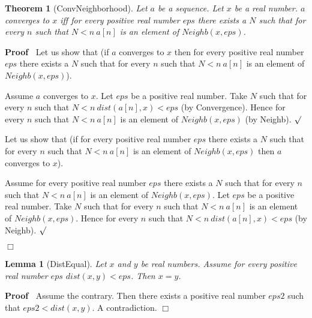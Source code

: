 \documentclass{article}
\newenvironment{forthel}{\begin{leftbar}}{\end{leftbar}}
\newenvironment{proof}{\noindent\textbf{Proof\ }}{\hspace*{\fill}$\Box$\medskip}
\newenvironment{subproof}{\begin{list}{}{}
		\item[\text{Proof}]}{\hfill $\surd$ \end{list}}
\newtheorem{lemma}{Lemma}
\newtheorem{theorem}{Theorem}
\begin{document}
\begin{forthel}
	\begin{theorem}[ConvNeighborhood]
	Let $a$ be a sequence. Let $x$ be a real number.
	$a$ converges to $x$ iff for every positive real number $eps$ there exists a $N$
	such that for every $n$ such that $N < n \ a[n]$ is an element of $Neighb(x,eps)$.
	\end{theorem}
	\begin{proof}
	Let us show that (if $a$ converges to $x$ then for every positive real number $eps$ there exists a $N$
	such that for every $n$ such that $N < n \ a[n]$ is an element of $Neighb(x,eps)$).
	\begin{subproof}
	Assume $a$ converges to $x$.
	Let $eps$ be a positive real number.
	Take $N$ such that for every $n$ such that $N < n \ dist(a[n],x) < eps$ (by Convergence).
	Hence for every $n$ such that $N < n \ a[n]$ is an element of $Neighb(x,eps)$ (by Neighb).
	\end{subproof}
	Let us show that (if for every positive real number $eps$ there exists a $N$ such that
	for every $n$ such that $N < n \ a[n]$ is an element of $Neighb(x,eps)$ then $a$ converges to $x$).
	\begin{subproof}
	Assume for every positive real number $eps$ there exists a $N$ such that
	for every $n$ such that $N < n \ a[n]$ is an element of $Neighb(x,eps)$.
	Let $eps$ be a positive real number.
	Take $N$ such that for every $n$ such that $N < n \ a[n]$ is an element of $Neighb(x,eps)$.
	Hence for every $n$ such that $N < n \ dist(a[n],x) < eps$ (by Neighb).
	\end{subproof}
	\end{proof}	
	
	\begin{lemma}[DistEqual]
	Let $x$ and $y$ be real numbers. Assume for every positive real number $eps$ $dist(x,y) < eps$.
	Then $x = y$.
	\end{lemma}
	\begin{proof}
	Assume the contrary.
	Then there exists a positive real number $eps2$ such that $eps2 < dist(x,y)$.
	A contradiction.
	\end{proof}
	

\end{forthel}
\end{document}
